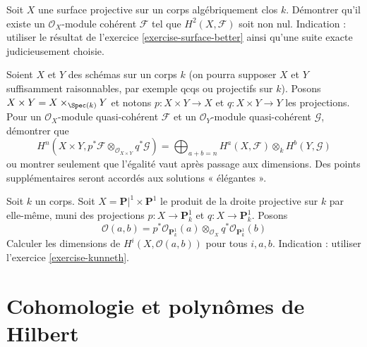 \begin{exercise}
\label{exercise-surface-h2-nonzero}
Soit $X$ une surface projective sur un corps algébriquement clos $k$.
Démontrer qu'il existe un $\mathcal{O}_X$-module cohérent $\mathcal{F}$
tel que $H^2(X, \mathcal{F})$ soit non nul. Indication : utiliser le résultat
de l'exercice \ref{exercise-surface-better} ainsi qu'une
suite exacte judicieusement choisie.
\end{exercise}

\begin{exercise}
\label{exercise-kunneth}
Soient $X$ et $Y$ des schémas sur un corps $k$ (on pourra supposer
$X$ et $Y$ suffisamment raisonnables, par exemple qcqs ou projectifs sur $k$).
Posons $X \times Y = X \times_{\Spec(k)} Y$ et notons
$p : X \times Y \to X$ et $q : X \times Y \to Y$ les projections. Pour
un $\mathcal{O}_X$-module quasi-cohérent $\mathcal{F}$ et
un $\mathcal{O}_Y$-module quasi-cohérent $\mathcal{G}$, démontrer que
$$
H^n(X \times Y,
p^*\mathcal{F} \otimes_{\mathcal{O}_{X \times Y}} q^*\mathcal{G}) =
\bigoplus\nolimits_{a + b = n}
H^a(X, \mathcal{F}) \otimes_k H^b(Y, \mathcal{G})
$$
ou montrer seulement que l'égalité vaut après passage aux dimensions.
Des points supplémentaires seront accordés aux solutions « élégantes ».
\end{exercise}

\begin{exercise}
\label{exercise-Oab}
Soit $k$ un corps. Soit $X = \mathbf{P}|^1 \times \mathbf{P}^1$
le produit de la droite projective sur $k$ par elle-même,
muni des projections $p : X \to \mathbf{P}^1_k$ et $q : X \to \mathbf{P}^1_k$.
Posons
$$
\mathcal{O}(a, b) = p^*\mathcal{O}_{\mathbf{P}^1_k}(a)
\otimes_{\mathcal{O}_X} q^*\mathcal{O}_{\mathbf{P}^1_k}(b)
$$
Calculer les dimensions de $H^i(X, \mathcal{O}(a, b))$
pour tous $i, a, b$. Indication : utiliser l'exercice \ref{exercise-kunneth}.
\end{exercise}










\section{Cohomologie et polynômes de Hilbert}
\label{section-cohomology-hilbert-polynomials}

